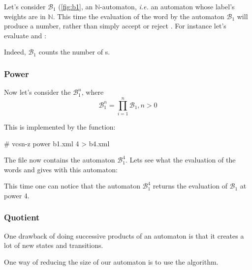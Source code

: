Let's consider $\mathcal{B}_1$ (\autoref{fig:b1}, an
$\mathbb{N}$-automaton, \textit{i.e.}  an automaton whose label's
weights are in $\mathbb{N}$.  This time the evaluation of the word
 by the automaton $\mathcal{B}_1$ will produce a number,
rather than simply accept or reject .  For instance let's
evaluate  and :


\noindent
Indeed, $\mathcal{B}_1$ counts the number of s.

\subsubsection{Power}

Now let's consider the $\mathcal{B}_1^n$, where
\begin{displaymath}
  \mathcal{B}_1^n = \prod_{i=1}^n \mathcal{B}_1, n > 0
\end{displaymath}

\noindent
This is implemented by the  function:

\begin{shell}
# vcsn-z power b1.xml 4 > b4.xml
\end{shell}

\noindent
The file  now contains the automaton $\mathcal{B}_1^4$.
Lets see what the evaluation of the words  and 
gives with this automaton:


This time one can notice that the automaton $\mathcal{B}_1^4$ returns
the evaluation of $\mathcal{B}_1$ at power 4.

\subsubsection{Quotient}

One drawback of doing successive products of an automaton is
that it creates a lot of new states and transitions.


One way of reducing the size of our automaton is to use the
 algorithm.

